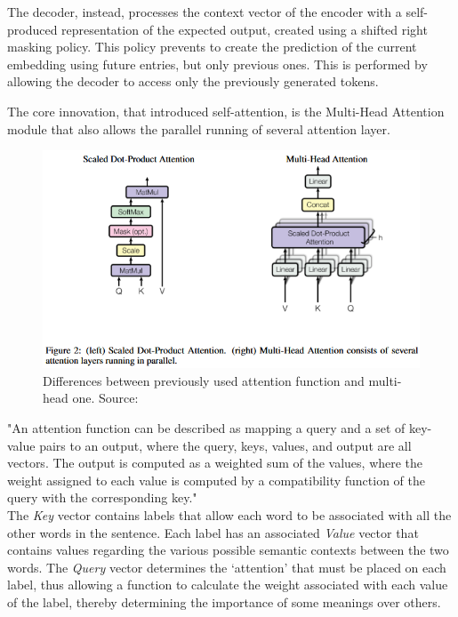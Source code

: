 \documentclass[12pt]{article}
\begin{document}
The decoder, instead, processes the context vector of the encoder with a self-produced representation of the expected output, created using a shifted right masking policy. This policy prevents to create the prediction of the current embedding using future entries, but only previous ones. This is performed by allowing the decoder to access only the previously generated tokens.

The core innovation, that introduced self-attention, is the Multi-Head Attention module that also allows the parallel running of several attention layer.
	\begin{figure}[H]
    \centering
            \includegraphics[width=1\textwidth]{attention.png}
    \caption[Multi-head attention function]{Differences between previously used attention function and multi-head one. Source: \cite{vaswani2023attentionneed}}
    \end{figure}
"An attention function can be described as mapping a query and a set of key-value pairs to an output, where the query, keys, values, and output are all vectors. The output is computed as a weighted sum of the values, where the weight assigned to each value is computed by a compatibility function of the query with the corresponding key."\cite{vaswani2023attentionneed}\\
The \textit{Key} vector contains labels that allow each word to be associated with all the other words in the sentence. Each label has an associated \textit{Value} vector that contains values regarding the various possible semantic contexts between the two words. The \textit{Query} vector determines the ‘attention’ that must be placed on each label, thus allowing a function to calculate the weight associated with each value of the label, thereby determining the importance of some meanings over others.
\end{document}
